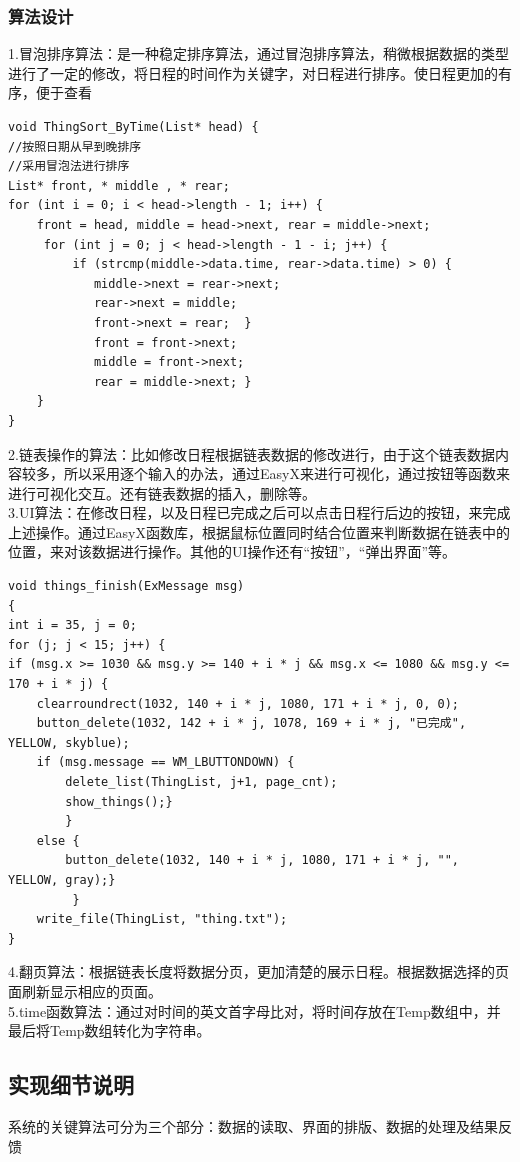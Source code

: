 \documentclass[UTF8]{article}
\begin{document}
\subsubsection{算法设计}

1.冒泡排序算法：是一种稳定排序算法，通过冒泡排序算法，稍微根据数据的类型进行了一定的修改，将日程的时间作为关键字，对日程进行排序。使日程更加的有序，便于查看
\begin{verbatim}
void ThingSort_ByTime(List* head) {
//按照日期从早到晚排序
//采用冒泡法进行排序
List* front, * middle , * rear;
for (int i = 0; i < head->length - 1; i++) {
    front = head, middle = head->next, rear = middle->next;
     for (int j = 0; j < head->length - 1 - i; j++) {
         if (strcmp(middle->data.time, rear->data.time) > 0) {
            middle->next = rear->next;
            rear->next = middle;
            front->next = rear;  }
            front = front->next;
            middle = front->next;
            rear = middle->next; }
    }
}
\end{verbatim}
2.链表操作的算法：比如修改日程根据链表数据的修改进行，由于这个链表数据内容较多，所以采用逐个输入的办法，通过EasyX来进行可视化，通过按钮等函数来进行可视化交互。还有链表数据的插入，删除等。\\
3.UI算法：在修改日程，以及日程已完成之后可以点击日程行后边的按钮，来完成上述操作。通过EasyX函数库，根据鼠标位置同时结合位置来判断数据在链表中的位置，来对该数据进行操作。其他的UI操作还有“按钮”，“弹出界面”等。
\begin{verbatim}
void things_finish(ExMessage msg)
{
int i = 35, j = 0;
for (j; j < 15; j++) {
if (msg.x >= 1030 && msg.y >= 140 + i * j && msg.x <= 1080 && msg.y <= 170 + i * j) {
    clearroundrect(1032, 140 + i * j, 1080, 171 + i * j, 0, 0);
    button_delete(1032, 142 + i * j, 1078, 169 + i * j, "已完成", YELLOW, skyblue);
    if (msg.message == WM_LBUTTONDOWN) {
        delete_list(ThingList, j+1, page_cnt);
        show_things();}
        }
    else {
        button_delete(1032, 140 + i * j, 1080, 171 + i * j, "", YELLOW, gray);}
         }
    write_file(ThingList, "thing.txt");
}
\end{verbatim}
4.翻页算法：根据链表长度将数据分页，更加清楚的展示日程。根据数据选择的页面刷新显示相应的页面。\\
5.time函数算法：通过对时间的英文首字母比对，将时间存放在Temp数组中，并最后将Temp数组转化为字符串。
\subsection{实现细节说明}
系统的关键算法可分为三个部分：数据的读取、界面的排版、数据的处理及结果反馈
\end{document}

